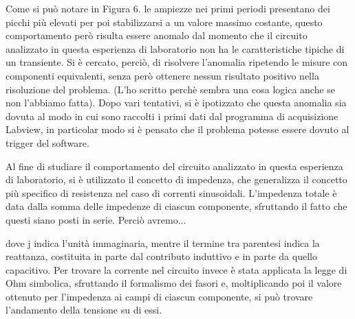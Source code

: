 Come si può notare in Figura 6. le ampiezze nei primi periodi presentano dei picchi più elevati per poi stabilizzarsi a un valore massimo costante, questo comportamento però risulta essere anomalo dal momento che il circuito analizzato in questa esperienza di laboratorio non ha le caratteristiche tipiche di un transiente.
Si è cercato, perciò, di risolvere l’anomalia ripetendo le misure con componenti equivalenti, senza però ottenere nessun risultato positivo nella risoluzione del problema. (L’ho scritto perchè sembra una cosa logica anche se non l’abbiamo fatta).
Dopo vari tentativi, si è ipotizzato che questa anomalia sia dovuta al modo in cui sono raccolti i primi dati dal programma di acquisizione Labview, in particolar modo si è pensato che il problema potesse essere dovuto al trigger del software.

Al fine di studiare il comportamento del circuito analizzato in questa esperienza di laboratorio, si è utilizzato il concetto di impedenza, che generalizza il concetto più specifico di resistenza nel caso di correnti sinusoidali.
L’impedenza totale è data dalla somma delle impedenze di ciascun componente, sfruttando il fatto che questi siano posti in serie. Perciò avremo...


dove j indica l’unità immaginaria, mentre il termine tra parentesi indica la reattanza, costituita in parte dal contributo induttivo e in parte da quello capacitivo.
Per trovare la corrente nel circuito invece è stata applicata la legge di Ohm simbolica, sfruttando il formalismo dei fasori e, moltiplicando poi il valore ottenuto per l’impedenza ai campi di ciascun componente, si può trovare l’andamento della tensione su di essi.
